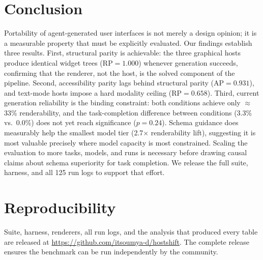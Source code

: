 \documentclass{article}
\begin{document}
\section{Conclusion}
Portability of agent-generated user interfaces is not merely a design opinion; it is a measurable property that must be explicitly evaluated. Our findings establish three results. First, structural parity is achievable: the three graphical hosts produce identical widget trees ($\mathrm{RP}=1.000$) whenever generation succeeds, confirming that the renderer, not the host, is the solved component of the pipeline. Second, accessibility parity lags behind structural parity ($\mathrm{AP}=0.931$), and text-mode hosts impose a hard modality ceiling ($\mathrm{RP}=0.658$). Third, current generation reliability is the binding constraint: both conditions achieve only $\approx$33\% renderability, and the task-completion difference between conditions (3.3\% vs.\ 0.0\%) does not yet reach significance ($p=0.24$). Schema guidance does measurably help the smallest model tier (2.7$\times$ renderability lift), suggesting it is most valuable precisely where model capacity is most constrained. Scaling the evaluation to more tasks, models, and runs is necessary before drawing causal claims about schema superiority for task completion. We release the full suite, harness, and all 125 run logs to support that effort.

\section*{Reproducibility}
Suite, harness, renderers, all run logs, and the analysis that produced every
table are released at \url{https://github.com/itsoumya-d/hostshift}. The complete release ensures the benchmark can be run independently by the community.



\end{document}

